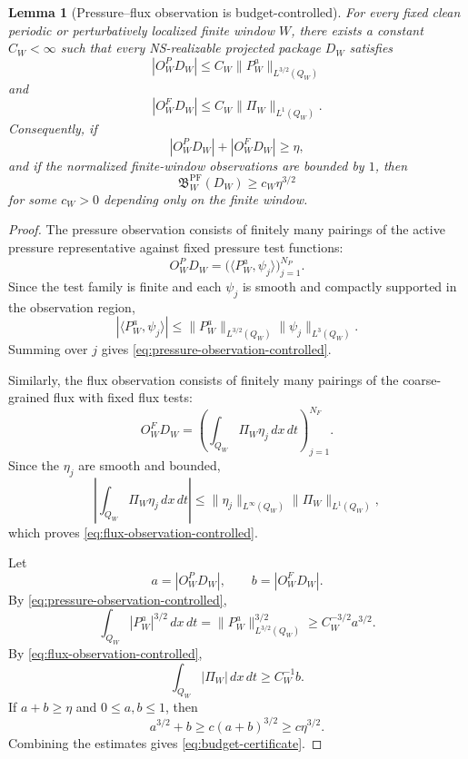 \documentclass[11pt]{article}
\numberwithin{equation}{section}
\theoremstyle{plain}
\newtheorem{lemma}[theorem]{Lemma}
\theoremstyle{definition}
\theoremstyle{remark}
\newcommand{\PF}{\mathrm{PF}}
\newcommand{\bfB}{\mathfrak B}
\begin{document}
\begin{lemma}[Pressure--flux observation is budget-controlled]
\label{lem:pf-observation-budget-controlled}
For every fixed clean periodic or perturbatively localized finite window \(W\), there exists a constant \(C_W<\infty\) such that every NS-realizable projected package \(D_W\) satisfies
\begin{equation}
        |O^P_WD_W|
        \le
        C_W\|P^a_W\|_{L^{3/2}(Q_W)}
        \label{eq:pressure-observation-controlled}
\end{equation}
and
\begin{equation}
        |O^F_WD_W|
        \le
        C_W\|\Pi_W\|_{L^1(Q_W)}.
        \label{eq:flux-observation-controlled}
\end{equation}
Consequently, if
\begin{equation}
        |O^P_WD_W|+|O^F_WD_W|\ge\eta,
        \label{eq:pf-observation-lower}
\end{equation}
and if the normalized finite-window observations are bounded by \(1\), then
\begin{equation}
        \bfB^{\PF}_W(D_W)
        \ge
        c_W\eta^{3/2}
        \label{eq:budget-certificate}
\end{equation}
for some \(c_W>0\) depending only on the finite window.
\end{lemma}

\begin{proof}
The pressure observation consists of finitely many pairings of the active pressure representative against fixed pressure test functions:
\[
        O^P_WD_W
        =
        \bigl(\langle P^a_W,\psi_j\rangle\bigr)_{j=1}^{N_P}.
\]
Since the test family is finite and each \(\psi_j\) is smooth and compactly supported in the observation region,
\[
        |\langle P^a_W,\psi_j\rangle|
        \le
        \|P^a_W\|_{L^{3/2}(Q_W)}\|\psi_j\|_{L^3(Q_W)}.
\]
Summing over \(j\) gives \eqref{eq:pressure-observation-controlled}.

Similarly, the flux observation consists of finitely many pairings of the coarse-grained flux with fixed flux tests:
\[
        O^F_WD_W
        =
        \left(\int_{Q_W}\Pi_W\eta_j\,dx\,dt\right)_{j=1}^{N_F}.
\]
Since the \(\eta_j\) are smooth and bounded,
\[
        \left|\int_{Q_W}\Pi_W\eta_j\,dx\,dt\right|
        \le
        \|\eta_j\|_{L^\infty(Q_W)}\|\Pi_W\|_{L^1(Q_W)},
\]
which proves \eqref{eq:flux-observation-controlled}.

Let
\[
        a=|O^P_WD_W|,
        \qquad
        b=|O^F_WD_W|.
\]
By \eqref{eq:pressure-observation-controlled},
\[
        \int_{Q_W}|P^a_W|^{3/2}\,dx\,dt
        =
        \|P^a_W\|_{L^{3/2}(Q_W)}^{3/2}
        \ge
        C_W^{-3/2}a^{3/2}.
\]
By \eqref{eq:flux-observation-controlled},
\[
        \int_{Q_W}|\Pi_W|\,dx\,dt
        \ge
        C_W^{-1}b.
\]
If \(a+b\ge\eta\) and \(0\le a,b\le1\), then
\[
        a^{3/2}+b
        \ge
        c(a+b)^{3/2}
        \ge
        c\eta^{3/2}.
\]
Combining the estimates gives \eqref{eq:budget-certificate}.
\end{proof}
\end{document}
